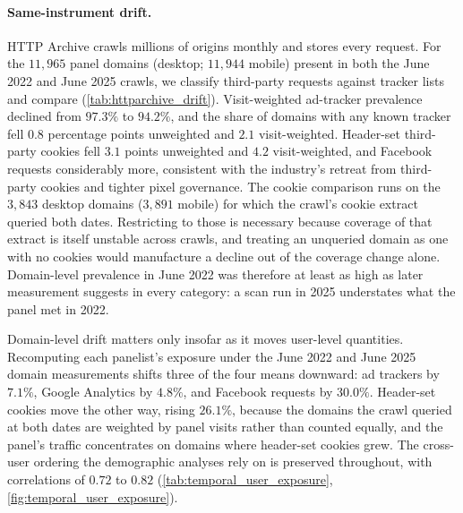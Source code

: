 \documentclass[12pt, letterpaper]{article}
\begin{document}
\paragraph{Same-instrument drift.}
HTTP Archive crawls millions of origins monthly and stores every request. For the $11{,}965$ panel domains (desktop; $11{,}944$ mobile) present in both the June 2022 and June 2025 crawls, we classify third-party requests against tracker lists and compare (\cref{tab:httparchive_drift}).
Visit-weighted ad-tracker prevalence declined from $97.3\%$ to $94.2\%$, and the share of domains with any known tracker fell $0.8$ percentage points unweighted and $2.1$ visit-weighted. Header-set third-party cookies fell $3.1$ points unweighted and $4.2$ visit-weighted, and Facebook requests considerably more, consistent with the industry's retreat from third-party cookies and tighter pixel governance. The cookie comparison runs on the $3{,}843$ desktop domains ($3{,}891$ mobile) for which the crawl's cookie extract queried both dates. Restricting to those is necessary because coverage of that extract is itself unstable across crawls, and treating an unqueried domain as one with no cookies would manufacture a decline out of the coverage change alone. Domain-level prevalence in June 2022 was therefore at least as high as later measurement suggests in every category: a scan run in 2025 understates what the panel met in 2022.
 
Domain-level drift matters only insofar as it moves user-level quantities. Recomputing each panelist's exposure under the June 2022 and June 2025 domain measurements shifts three of the four means downward: ad trackers by $7.1\%$, Google Analytics by $4.8\%$, and Facebook requests by $30.0\%$. Header-set cookies move the other way, rising $26.1\%$, because the domains the crawl queried at both dates are weighted by panel visits rather than counted equally, and the panel's traffic concentrates on domains where header-set cookies grew. The cross-user ordering the demographic analyses rely on is preserved throughout, with correlations of $0.72$ to $0.82$ (\cref{tab:temporal_user_exposure}, \cref{fig:temporal_user_exposure}).
 
\end{document}
